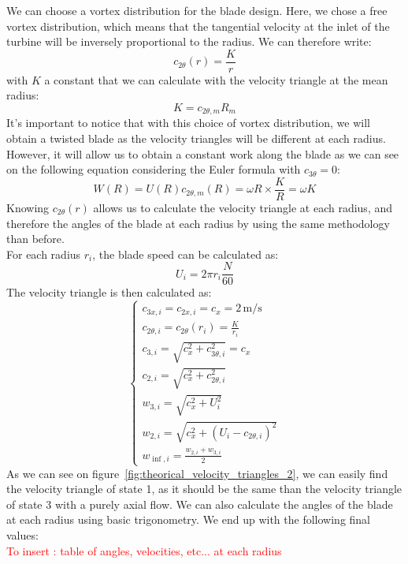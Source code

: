 We can choose a vortex distribution for the blade design.
Here, we chose a free vortex distribution, which means that the tangential velocity at the inlet of the turbine will be inversely proportional to the radius. We can therefore write:
\begin{equation}
c_{2 \theta}(r) = \frac{K}{r}
\end{equation}
with $K$ a constant that we can calculate with the velocity triangle at the mean radius:
\begin{equation}
K = c_{2 \theta,m} R_m
\end{equation}
It's important to notice that with this choice of vortex distribution, we will obtain a twisted blade as the velocity triangles will be different at each radius. However, it will allow us to obtain a constant work along the blade as we can see on the following equation considering the Euler formula with $c_{3 \theta} = 0$:
\begin{equation}
W(R) = U(R) c_{2 \theta,m}(R) = \omega R \times \frac{K}{R} = \omega K
\end{equation}
Knowing $c_{2 \theta}(r)$ allows us to calculate the velocity triangle at each radius, and therefore the angles of the blade at each radius by using the same methodology than before.\\
For each radius $r_i$, the blade speed can be calculated as:
\begin{equation}
U_i = 2 \pi r_i \frac{N}{60}
\end{equation}
The velocity triangle is then calculated as:
\begin{equation}
\begin{cases}
c_{3x,i} = c_{2x,i} = c_{x} = 2 \, \mathrm{m/s} \\
c_{2\theta, i} = c_{2\theta}(r_i) = \frac{K}{r_i} \\
c_{3,i} = \sqrt{c_{x}^2 + c_{3\theta,i}^2} = c_x \\
c_{2,i} = \sqrt{c_{x}^2 + c_{2\theta,i}^2} \\
w_{3,i} = \sqrt{c_{x}^2 + U_i^2} \\
w_{2,i} = \sqrt{c_{x}^2 + \left(U_i - c_{2\theta, i}\right)^2} \\
w_{\inf , i} = \frac{w_{2,i} + w_{3,i}}{2}
\end{cases}
\end{equation}
As we can see on figure~\ref{fig:theorical_velocity_triangles_2}, we can easily find the velocity triangle of state 1, as it should be the same than the velocity triangle of state 3 with a purely axial flow.
We can also calculate the angles of the blade at each radius using basic trigonometry. We end up with the following final values:\\
\textcolor{red}{To insert : table of angles, velocities, etc... at each radius}

